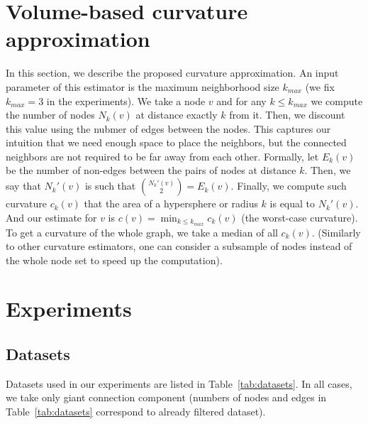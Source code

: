 \documentclass{article} %
\begin{document}
\section{Volume-based curvature approximation}

In this section, we describe the proposed curvature approximation. An input parameter of this estimator is the maximum neighborhood size $k_{max}$ (we fix $k_{max} = 3$ in the experiments). We take a node $v$ and for any $k \le k_{max}$ we compute the number of nodes $N_k(v)$ at distance exactly $k$ from it.
Then, we discount this value using the nubmer of edges between the nodes.
This captures our intuition that we need enough space to place the neighbors, but the connected neighbors are not required to be far away from each other.
Formally, let $E_k(v)$ be the number of non-edges between the pairs of nodes at distance $k$. Then, we say that $N_k'(v)$ is such that ${N_k'(v) \choose 2} = E_k(v)$.  Finally, we compute such curvature $c_k(v)$ that the area of a hypersphere or radius $k$ is equal to $N_k'(v)$. And our estimate for $v$ is $c(v) = \min_{k \le k_{max}} c_k(v)$ (the worst-case curvature). To get a curvature of the whole graph, we take a median of all $c_k(v)$. (Similarly to other curvature estimators, one can consider a subsample of nodes instead of the whole node set to speed up the computation).

\section{Experiments}

\subsection{Datasets}\label{sec:datasets}

Datasets used in our experiments are listed in Table~\ref{tab:datasets}. In all cases, we take only giant connection component (numbers of nodes and edges in Table~\ref{tab:datasets} correspond to already filtered dataset).
\end{document}
